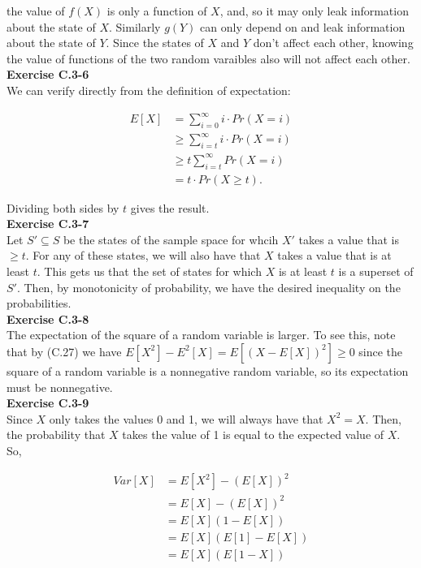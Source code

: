 \documentclass{article}
\begin{document}
the value of $f(X)$ is only a function of $X$, and, so it may only leak information about the state of $X$. Similarly $g(Y)$ can only depend on and leak information about the state of $Y$. Since the states of $X$ and $Y$ don't affect each other, knowing the value of functions of the two random varaibles also will not affect each other.\\



\noindent\textbf{Exercise C.3-6}\\

We can verify directly from the definition of expectation:

\begin{align*}
E[X] &= \sum_{i=0}^\infty i \cdot Pr(X = i) \\
& \geq \sum_{i=t}^\infty i \cdot Pr(X=i) \\
&\geq t\sum_{i=t}^\infty Pr(X=i) \\
&= t\cdot Pr(X \geq t).
\end{align*}

Dividing both sides by $t$ gives the result. \\

\noindent\textbf{Exercise C.3-7}\\

Let $S' \subseteq S$ be the states of the sample space for whcih $X'$ takes a value that is $\ge t$.  For any of these states, we will also have that $X$ takes a value that is at least $t$. This gets us that the set of states for which $X$ is at least $t$ is a superset of $S'$. Then, by monotonicity of probability, we have the desired inequality on the probabilities.\\


\noindent\textbf{Exercise C.3-8}\\

The expectation of the square of a random variable is larger.  To see this, note that by (C.27) we have $E[X^2] - E^2[X] = E[(X-E[X])^2] \geq 0$ since the square of a random variable is a nonnegative random variable, so its expectation must be nonnegative. \\

\noindent\textbf{Exercise C.3-9}\\

Since $X$ only takes the values 0 and 1, we will always have that $X^2 = X$. Then, the probability that $X$ takes the value of 1 is equal to the expected value of $X$. So,

\begin{align*}
Var[X ] &=E[X^2] - (E[X])^2\\
&= E[X] - (E[X])^2 \\
&= E[X] (1-E[X])\\
&= E[X] (E[1]-E[X])\\
&= E[X] (E[1-X])
\end{align*}
\end{document}
